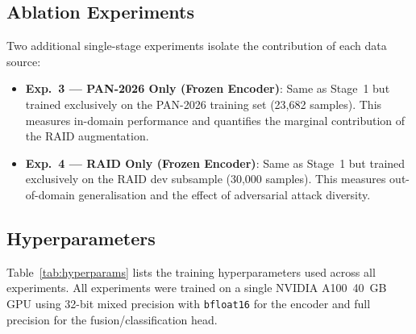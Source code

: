 \subsection{Ablation Experiments}

Two additional single-stage experiments isolate the contribution of each data source:

\begin{itemize}
  \item \textbf{Exp.~3 — PAN-2026 Only (Frozen Encoder)}: Same as Stage~1 but trained
        exclusively on the PAN-2026 training set (23,682 samples). This measures in-domain
        performance and quantifies the marginal contribution of the RAID augmentation.
  \item \textbf{Exp.~4 — RAID Only (Frozen Encoder)}: Same as Stage~1 but trained
        exclusively on the RAID dev subsample (30,000 samples). This measures out-of-domain
        generalisation and the effect of adversarial attack diversity.
\end{itemize}

\subsection{Hyperparameters}

Table~\ref{tab:hyperparams} lists the training hyperparameters used across all experiments.
All experiments were trained on a single NVIDIA A100~40~GB GPU using 32-bit mixed precision
with \texttt{bfloat16} for the encoder and full precision for the fusion/classification head.

